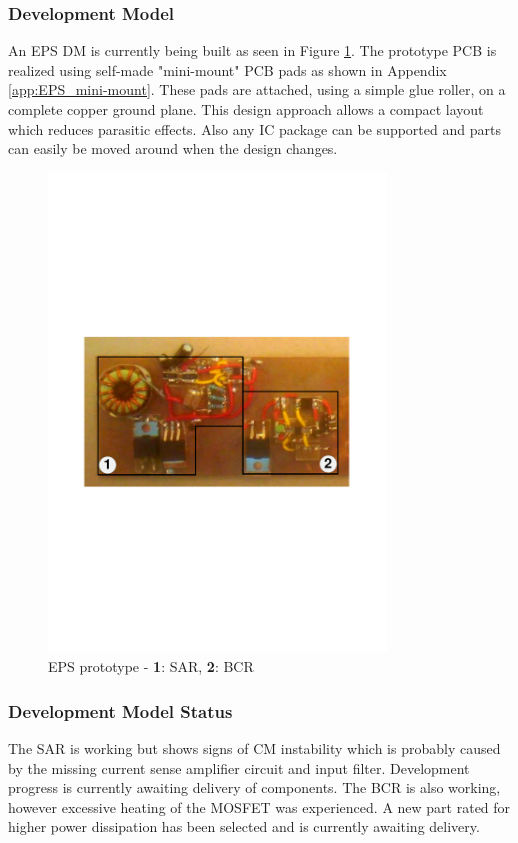 \subsubsection{Development Model}
An \ac{EPS} \ac{DM} is currently being built as seen in Figure \ref{fig:EPSprototype}. The prototype \ac{PCB} is realized using self-made "mini-mount" \ac{PCB} pads as shown in Appendix \ref{app:EPS_mini-mount}. These pads are attached, using a simple glue roller, on a complete copper ground plane. This design approach allows a compact layout which reduces parasitic effects. Also any \ac{IC} package can be supported and parts can easily be moved around when the design changes.
%
\begin{figure}[H]
\centering
\includegraphics[width=0.8\textwidth]{figures/fig_CDR_EPSprototype}
\caption[EPS prototype]{EPS prototype - \textbf{1}: SAR, \textbf{2}: BCR}
\label{fig:EPSprototype}
\end{figure}
%
\subsubsection*{Development Model Status}
The \ac{SAR} is working but shows signs of \ac{CM} instability which is probably caused by the missing current sense amplifier circuit and input filter. Development progress is currently awaiting delivery of components. The \ac{BCR} is also working, however excessive heating of the \ac{MOSFET} was experienced. A new part rated for higher power dissipation has been selected and is currently awaiting delivery.
%
